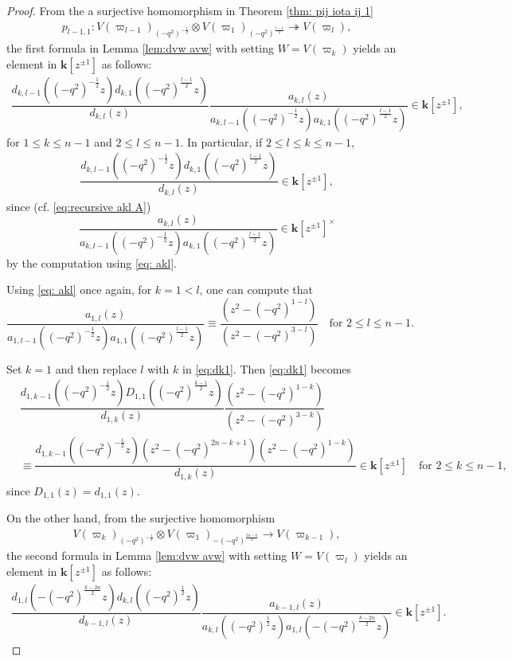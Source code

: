 \documentclass[11pt, leqno]{amsart}
\theoremstyle{definition}
\numberwithin{equation}{section}
\begin{document}
\begin{proof}
From the a surjective homomorphism in Theorem \ref{thm: pij iota ij 1}
\begin{align*}
  p_{l-1,1} \colon V(\varpi_{l-1})_{{(-q^2)}^{-\frac{1}{2}}} \otimes V(\varpi_{1})_{{(-q^2)}^{\frac{l-1}{2}}}
  \twoheadrightarrow V(\varpi_{l}),
  \end{align*}
the first formula in Lemma \ref{lem:dvw avw} with setting $W=V({\varpi}_k)$ yields an element in ${\mathbf{k}}[z^{\pm 1}]$ as follows:
\begin{align}\label{eq:dk1}
\dfrac{d_{k,l-1}({(-q^2)}^{-\frac{1}{2}}z)d_{k,1}({(-q^2)}^{\frac{l-1}{2}}z)}{d_{k,l}(z)} \dfrac{a_{k,l}(z)}
{a_{k,l-1}({(-q^2)}^{-\frac{1}{2}}z)a_{k,1}({(-q^2)}^{\frac{l-1}{2}}z)} \in {\mathbf{k}}[z^{\pm 1}],
\end{align}
for $1 \le k \le n-1$ and  $2 \le l \le n-1$. In particular, if $2 \le l \le k \le n-1$,
\begin{align} \label{eq:dkl induction argu}  \dfrac{d_{k,l-1}({(-q^2)}^{-\frac{1}{2}}z)d_{k,1}({(-q^2)}^{\frac{l-1}{2}}z)}{d_{k,l}(z) } \in {\mathbf{k}}[z^{\pm 1}],
\end{align}
since (cf. \eqref{eq:recursive akl A})
$$\dfrac{a_{k,l}(z)}{a_{k,l-1}({(-q^2)}^{-\frac{1}{2}}z)a_{k,1}({(-q^2)}^{\frac{l-1}{2}}z)} \in {\mathbf{k}}[z^{\pm 1}]^\times$$
by the computation using \eqref{eq: akl}.

Using \eqref{eq: akl} once again, for $k=1 < l$, one can compute that
$$\dfrac{a_{1,l}(z)}{a_{1,l-1}({(-q^2)}^{-\frac{1}{2}}z) a_{1,1}({(-q^2)}^{\frac{l-1}{2}}z)} \equiv
\dfrac{(z^2-{(-q^2)}^{1-l})}{(z^2-{(-q^2)}^{3-l})} \quad \text{for $2 \le l \le n-1$.}$$

Set $k=1$ and then replace $l$ with $k$ in \eqref{eq:dk1}. Then \eqref{eq:dk1} becomes
\begin{equation}\label{eq:d1l divides blabla D}
\begin{aligned}
 &\dfrac{d_{1,k-1}({(-q^2)}^{-\frac{1}{2}}z)D_{1,1}({(-q^2)}^{\frac{k-1}{2}}z)}{d_{1,k}(z)}
  \dfrac{(z^2-{(-q^2)}^{1-k})}{(z^2-{(-q^2)}^{3-k})} \\[1ex]
 &\equiv \dfrac{d_{1,k-1}({(-q^2)}^{-\frac{1}{2}}z)(z^2-{(-q^2)}^{2n-k+1})
  (z^2-{(-q^2)}^{1-k})}{d_{1,k}(z)}
    \in {\mathbf{k}}[z^{\pm 1}]
    \quad \text{for $2 \le k\leq n-1$,}
\end{aligned}
\end{equation}
since $D_{1,1}(z)=d_{1,1}(z)$.

On the other hand, from the surjective homomorphism
\begin{align*}
V(\varpi_k)_{{(-q^2)}^{-\frac{1}{2}}} \otimes
V(\varpi_1)_{-{(-q^2)}^{\frac{2n-k}{2}}} \rightarrow V(\varpi_{k-1}),
  \end{align*}
the second formula in Lemma \ref{lem:dvw avw} with setting $W=V({\varpi}_l)$ yields an element in ${\mathbf{k}}[z^{\pm 1}]$ as follows:
\begin{align} \label{eq: D 2}
\dfrac{d_{1,l}(-{(-q^2)}^{\frac{k-2n}{2}}z)d_{k,l}({(-q^2)}^{\frac{1}{2}}z)}{d_{k-1,l}(z)}
\dfrac{a_{k-1,l}(z)}{ a_{k,l}({(-q^2)}^{\frac{1}{2}}z)
a_{1,l}(-{(-q^2)}^{\frac{k-2n}{2}}z)} \in {\mathbf{k}}[z^{\pm 1}].
\end{align}


\end{proof}
\end{document}
